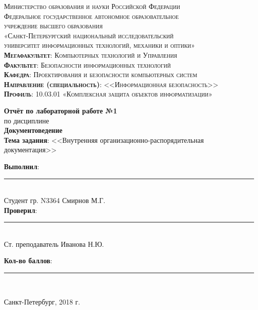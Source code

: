 \begin{titlepage}
	\begin{center}
		\textsc{
			\fontsize{12pt}{14pt}\selectfont
			Министерство образования и науки Российской Федерации\\
			Федеральное государственное автономное образовательное\\
			учреждение высшего образования\\
			«Санкт-Петербургский национальный исследовательский\\
			университет информационных технологий, механики и оптики»\\
			\textbf{Мегафакультет}:  Компьютерных технологий и Управления\\
			\textbf{Факультет}: Безопасности информационных технологий\\
			\textbf{Кафедра}: Проектирования и безопасности компьютерных систем\\
			\textbf{Направление (специальность)}: <<Информационная безопасность>>\\
			\textbf{Профиль}: 10.03.01 «Комплексная защита объектов информатизации»}
		
		\vfill
		
		\textbf{Отчёт по лабораторной работе №1}\\
		по дисциплине\\
		\textbf{Документоведение}\\
	\vfill
	\textbf{Тема задания}: <<Внутренняя организационно-распорядительная документация>>\\
	\end{center}

	\vfill
	
	\begin{flushright}
	\textbf{Выполнил}: \rule{10em}{.1pt}\\
	Студент гр. N3364 Смирнов М.Г.\\
	\textbf{Проверил}: \rule{10em}{.1pt}\\
	Ст. преподаватель Иванова Н.Ю.
		\vfill

	\textbf{Кол-во баллов}: \rule{10em}{.1pt}\\

	\vfill
	


	\end{flushright}
	\vfill
	\begin{center}
		Санкт-Петербург, 2018 г.
	\end{center}
\end{titlepage}
